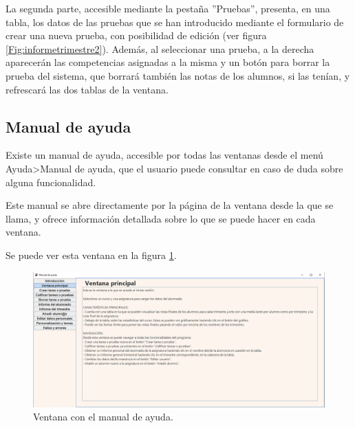 La segunda parte, accesible mediante la pestaña ''Pruebas'', presenta, en una tabla, los datos de las pruebas que se han introducido mediante el formulario de crear una nueva prueba, con posibilidad de edición (ver figura \ref{Fig:informetrimestre2}). Además, al seleccionar una prueba, a la derecha aparecerán las competencias asignadas a la misma y un botón para borrar la prueba del sistema, que borrará también las notas de los alumnos, si las tenían, y refrescará las dos tablas de la ventana.

\subsection{Manual de ayuda}
Existe un manual de ayuda, accesible por todas las ventanas desde el menú Ayuda>Manual de ayuda, que el usuario puede consultar en caso de duda sobre alguna funcionalidad.

Este manual se abre directamente por la página de la ventana desde la que se llama, y ofrece información detallada sobre lo que se puede hacer en cada ventana.

Se puede ver esta ventana en la figura \ref{Fig:ayuda}.

\begin{figure}[H]
\centering\includegraphics[width=1\linewidth]{figs/ayuda.png}
\caption{Ventana con el manual de ayuda.}
\label{Fig:ayuda}
\end{figure}
